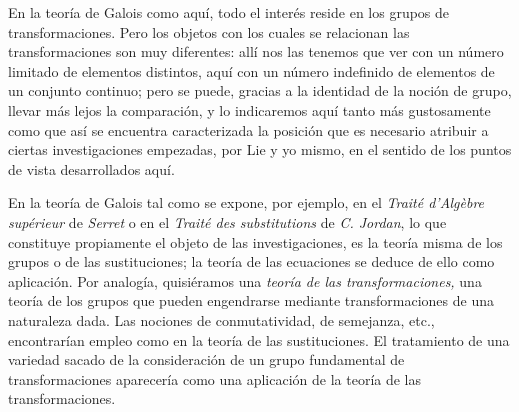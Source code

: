 \documentclass[a4paper, 12pt]{article}
\begin{document}
En la teoría de Galois como aquí, todo el interés reside en los grupos de transformaciones. Pero los objetos con los cuales se relacionan las transformaciones son muy diferentes: allí nos las tenemos que ver con un número limitado de elementos distintos, aquí con un número indefinido de elementos de un conjunto continuo; pero se puede, gracias a la identidad de la noción de grupo, llevar más lejos la comparación, y lo indicaremos aquí tanto más gustosamente como que así se encuentra caracterizada la posición que es necesario atribuir a ciertas investigaciones empezadas, por Lie y yo mismo, en el sentido de los puntos de vista desarrollados aquí.

En la teoría de Galois tal como se expone, por ejemplo, en el \textit{Traité d'Al\-gèbre supérieur }de\textit{ Serret} o en el \textit{Traité des substitutions }de \textit{C. Jordan}, lo que constituye propiamente el objeto de las investigaciones, es la teoría misma de los grupos o de las sustituciones; la teoría de las ecuaciones se deduce de ello como aplicación. Por analogía, quisiéramos una \textit{teoría de las transformaciones,} una teoría de los grupos que pueden engendrarse mediante transformaciones de una naturaleza dada. Las nociones de conmutatividad, de semejanza, etc., encontrarían empleo como en la teoría de las sustituciones. El tratamiento de una variedad sacado de la consideración de un grupo fundamental de transformaciones aparecería como una aplicación de la teoría de las transformaciones. 
\end{document}

